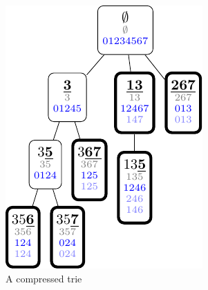 \begin{figure}[htb]
\centering
\includegraphics{50-trie/img/vizc2}
\caption{A compressed trie}
\label{fig:vizc2}
\end{figure}



